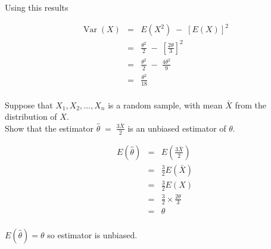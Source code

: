 \documentclass[a4paper,12pt]{article}
\begin{document}
Using this results

\begin{eqnarray*} \operatorname{Var}( X ) &=& E ( X^2 ) \;-\; [ E ( X )]^2 \\
&=&  \frac{ \theta^2}{2} \;-\; \left[ \frac{2 \theta}{3}\right] ^2 \\
&=&  \frac{ \theta^2}{2} \;-\;  \frac{4 \theta ^2 }{9}\\
&=&  \frac{ \theta^2}{18} \\
\end{eqnarray*}

\newpage

\begin{framed}
\noindent Suppose that $X_1 , X_2 , \ldots , X_n$ is a random sample, with mean $\bar{X}$  from the distribution
of $X$.
\\ 
Show that the estimator $ {  \displaystyle \hat{\theta}  \;=\; \frac{3\bar{X}}{2} }$ is an unbiased estimator of $\theta$.
\end{framed}

\begin{eqnarray*}
E(\hat{\theta}) &=&  E \left( \frac{3\bar{X}}{2} \right)\\
&=& \frac{3}{2} E(\bar{X}) \\ 
&=& \frac{3}{2} E(X) \\ 
&=& \frac{3}{2} \times \frac{2 \theta }{3} \\ 
&=& \theta \\
\end{eqnarray*}

$E(\hat{\theta}) = \theta$ so estimator is unbiased.


\end{document}
